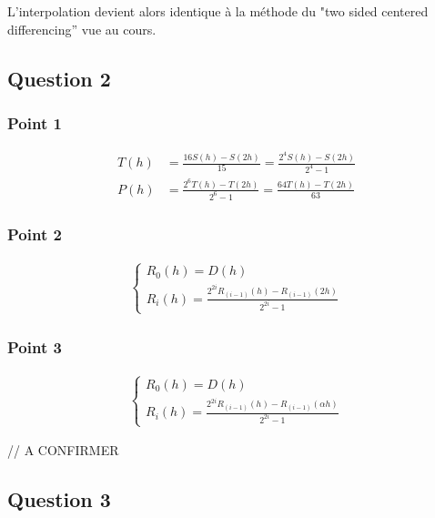 L'interpolation devient alors identique à la méthode du "two sided centered differencing'' vue au cours.

\subsection{Question 2}

\subsubsection{Point 1}

\begin{equation}
	\begin{aligned}
		T(h) &= \frac{16S(h)-S(2h)}{15} = \frac{2^4S(h)-S(2h)}{2^4-1}\\
		P(h) &= \frac{2^6T(h)-T(2h)}{2^6-1} = \frac{64T(h)-T(2h)}{63}
	\end{aligned}
\end{equation}

\subsubsection{Point 2}

\begin{equation}
	\begin{aligned}
		\begin{cases} 
			R_0(h) = D(h)\\
			R_i(h) = \frac{2^{2i}R_{(i-1)}(h) - R_{(i-1)}(2h)}{2^{2i}-1}
		\end{cases}
	\end{aligned}
\end{equation}

\subsubsection{Point 3}

\begin{equation}
	\begin{aligned}
		\begin{cases} 
			R_0(h) = D(h)\\
			R_i(h) = \frac{2^{2i}R_{(i-1)}(h) - R_{(i-1)}(\alpha h)}{2^{2i}-1}
		\end{cases}
	\end{aligned}
\end{equation}

// A CONFIRMER

\subsection{Question 3}

